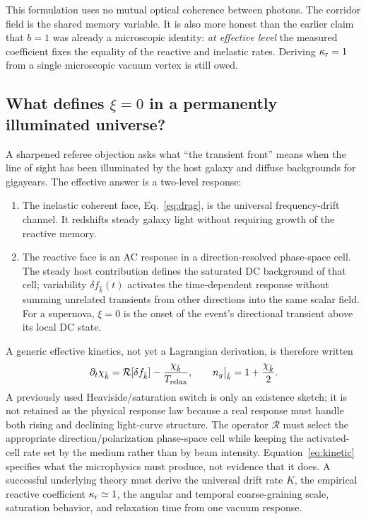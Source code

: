 \documentclass[11pt]{article}
\newcommand{\kreact}{\kappa_{\rm r}}
\begin{document}
This formulation uses no mutual optical coherence between photons. The corridor field is the shared memory variable. It is also more honest than the earlier claim that $b=1$ was already a microscopic identity: \emph{at effective level} the measured coefficient fixes the equality of the reactive and inelastic rates. Deriving $\kreact=1$ from a single microscopic vacuum vertex is still owed.

\subsection{What defines $\xi=0$ in a permanently illuminated universe?}
A sharpened referee objection asks what ``the transient front'' means when the line of sight has been illuminated by the host galaxy and diffuse backgrounds for gigayears. The effective answer is a two-level response:

\begin{enumerate}[label=(\roman*)]
\item The inelastic coherent face, Eq.~\eqref{eq:drag}, is the universal frequency-drift channel. It redshifts steady galaxy light without requiring growth of the reactive memory.
\item The reactive face is an AC response in a direction-resolved phase-space cell. The steady host contribution defines the saturated DC background of that cell; variability $\delta f_{\hat{k}}(t)$ activates the time-dependent response without summing unrelated transients from other directions into the same scalar field. For a supernova, $\xi=0$ is the onset of the event's directional transient above its local DC state.
\end{enumerate}

A generic effective kinetics, not yet a Lagrangian derivation, is therefore written
\begin{equation}
 \partial_t\chi_{\hat{k}}
 =\mathcal{R}[\delta f_{\hat{k}}]
 -\frac{\chi_{\hat{k}}}{T_{\rm relax}},
 \qquad n_g\big|_{\hat{k}}=1+\frac{\chi_{\hat{k}}}{2}.
 \label{eq:kinetic}
\end{equation}
A previously used Heaviside/saturation switch is only an existence sketch; it is not retained as the physical response law because a real response must handle both rising and declining light-curve structure. The operator $\mathcal{R}$ must select the appropriate direction/polarization phase-space cell while keeping the activated-cell rate set by the medium rather than by beam intensity. Equation~\eqref{eq:kinetic} specifies what the microphysics must produce, not evidence that it does. A successful underlying theory must derive the universal drift rate $K$, the empirical reactive coefficient $\kreact\simeq1$, the angular and temporal coarse-graining scale, saturation behavior, and relaxation time from one vacuum response.
\end{document}
